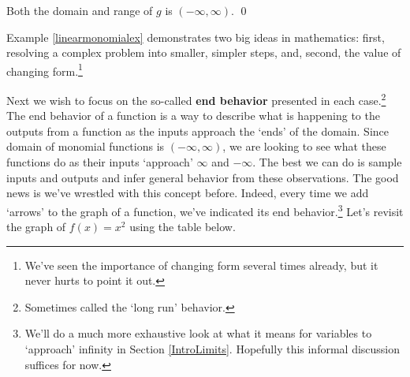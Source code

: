 \documentclass{ximera}
\begin{document}
\begin{example}
\begin{enumerate}


 
 
 Both the domain and range of $g$ is $(-\infty, \infty)$. \qed
 
 \end{enumerate} 

 
\end{example}


Example \ref{linearmonomialex} demonstrates two big ideas in mathematics:  first, resolving a complex problem into smaller, simpler steps, and, second, the value of changing form.\footnote{We've seen the importance of changing form several times already, but it never hurts to point it out.}

Next  we wish  to focus on the so-called  \textbf{end behavior} presented in each case.\footnote{Sometimes called the `long run' behavior.}  The end behavior of a function is a way to describe what is happening to the outputs from a function as the inputs approach the `ends' of the domain. Since domain of monomial functions is $(-\infty, \infty)$, we are looking to see what these functions do as their inputs `approach'  $\infty$ and $-\infty$.  The best we can do is sample inputs and outputs and infer general behavior from these observations.  The good news is we've wrestled with this concept before. Indeed, every time we add `arrows' to the graph of a function, we've indicated its end behavior.\footnote{We'll do a much more exhaustive look at what it means for variables to `approach' infinity in Section \ref{IntroLimits}.  Hopefully this informal discussion suffices for now.} Let's revisit  the graph of $f(x) = x^2$ using the table below.
\end{document}
